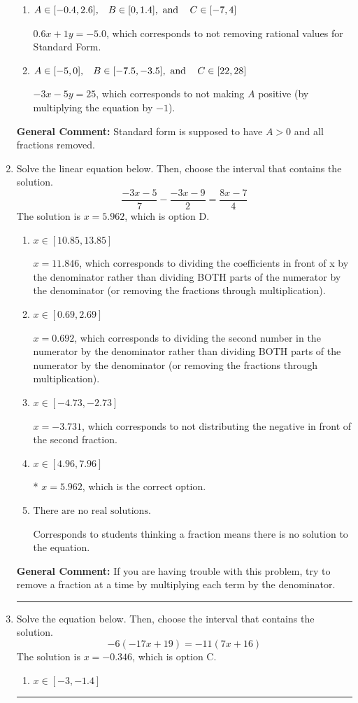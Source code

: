 \documentclass{extbook}[14pt]
\newcommand{\litem}[1]{\item #1

\rule{\textwidth}{0.4pt}}
\begin{document}
\begin{enumerate}
{\begin{enumerate}[label=\Alph*.]
* $3x + 5y = -25$, which is the correct option.
\item \( A \in [-0.4, 2.6], \hspace{3mm} B \in [0, 1.4], \text{ and } \hspace{3mm} C \in [-7, 4] \)

 $0.6x + 1y = -5.0$, which corresponds to not removing rational values for Standard Form.
\item \( A \in [-5, 0], \hspace{3mm} B \in [-7.5, -3.5], \text{ and } \hspace{3mm} C \in [22, 28] \)

 $-3x - 5y = 25$, which corresponds to not making $A$ positive (by multiplying the equation by $-1$).
\end{enumerate}

\textbf{General Comment:} Standard form is supposed to have $A > 0$ and all fractions removed.
}
\litem{
Solve the linear equation below. Then, choose the interval that contains the solution.
\[ \frac{-3x -5}{7} - \frac{-3x -9}{2} = \frac{8x -7}{4} \]The solution is \( x = 5.962 \), which is option D.\begin{enumerate}[label=\Alph*.]
\item \( x \in [10.85, 13.85] \)

 $x = 11.846$, which corresponds to dividing the coefficients in front of x by the denominator rather than dividing BOTH parts of the numerator by the denominator (or removing the fractions through multiplication).
\item \( x \in [0.69, 2.69] \)

 $x = 0.692$, which corresponds to dividing the second number in the numerator by the denominator rather than dividing BOTH parts of the numerator by the denominator (or removing the fractions through multiplication).
\item \( x \in [-4.73, -2.73] \)

 $x = -3.731$, which corresponds to not distributing the negative in front of the second fraction.
\item \( x \in [4.96, 7.96] \)

* $x = 5.962$, which is the correct option.
\item \( \text{There are no real solutions.} \)

Corresponds to students thinking a fraction means there is no solution to the equation.
\end{enumerate}

\textbf{General Comment:} If you are having trouble with this problem, try to remove a fraction at a time by multiplying each term by the denominator.
}
\litem{
Solve the equation below. Then, choose the interval that contains the solution.
\[ -6(-17x + 19) = -11(7x + 16) \]The solution is \( x = -0.346 \), which is option C.\begin{enumerate}[label=\Alph*.]
\item \( x \in [-3, -1.4] \)


\end{enumerate}}
\end{enumerate}
\end{document}

